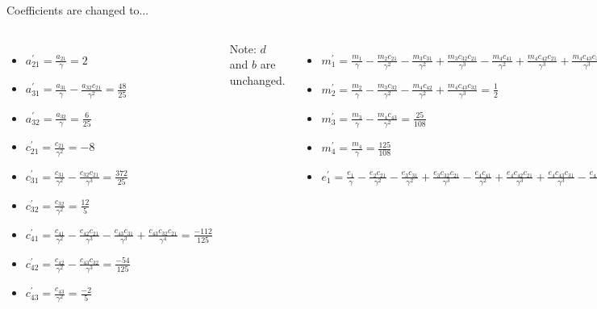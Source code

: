 \documentclass[serif]{beamer}
\begin{document}
\begin{frame}{Coefficients are changed to...}
  \begin{footnotesize}
  \begin{columns}[T]
  \begin{itemize}
    \item $a^\prime_{21} = \frac{a_{21}}{\gamma} = 2$ \vfill
    \item $a^\prime_{31} = \frac{a_{31}}{\gamma} - \frac{a_{32}c_{21}}{\gamma^2} = \frac{48}{25}$ \vfill
    \item $a^\prime_{32} = \frac{a_{32}}{\gamma} = \frac{6}{25}$ \vfill
    \item $c^\prime_{21} = \frac{c_{21}}{\gamma^2} = -8$ \vfill
    \item $c^\prime_{31} = \frac{c_{31}}{\gamma^2} - \frac{c_{32}c_{21}}{\gamma^3} = \frac{372}{25}$ \vfill
    \item $c^\prime_{32} = \frac{c_{32}}{\gamma^2} = \frac{12}{5}$ \vfill
    \item $c^\prime_{41} = \frac{c_{41}}{\gamma^2} - \frac{c_{42}c_{21}}{\gamma^3} - \frac{c_{43}c_{31}}{\gamma^3} + \frac{c_{43}c_{32}c_{21}}{\gamma^4} = \frac{-112}{125}$ \vfill
    \item $c^\prime_{42} = \frac{c_{42}}{\gamma^2} - \frac{c_{43}c_{32}}{\gamma^3} = \frac{-54}{125}$ \vfill
    \item $c^\prime_{43} = \frac{c_{43}}{\gamma^2} = \frac{-2}{5}$ \vfill
  \end{itemize}
  \alert{Note:} $d$ and $b$ are unchanged.
  \begin{itemize}
    \item $m^\prime_1 = \frac{m_1}{\gamma} - \frac{m_2c_{21}}{\gamma^2} - \frac{m_3c_{31}}{\gamma^2} + \frac{m_3c_{32}c_{21}}{\gamma^3} - \frac{m_4c_{41}}{\gamma^2} + \frac{m_4c_{42}c_{21}}{\gamma^3} + \frac{m_4c_{43}c_{31}}{\gamma^3} - \frac{m_4c_{43}c_{32}c_{21}}{\gamma^4} = \frac{19}{9}$
    \item $m^\prime_2 = \frac{m_2}{\gamma} - \frac{m_3c_{32}}{\gamma^2} - \frac{m_4c_{42}}{\gamma^2} + \frac{m_4c_{43}c_{32}}{\gamma^3} = \frac{1}{2}$
    \item $m^\prime_3 = \frac{m_3}{\gamma} - \frac{m_4c_{43}}{\gamma^2} = \frac{25}{108}$
    \item $m^\prime_4 = \frac{m_4}{\gamma} = \frac{125}{108}$
    \item $e^\prime_1 = \frac{e_1}{\gamma} - \frac{e_2c_{21}}{\gamma^2} - \frac{e_3c_{31}}{\gamma^2} + \frac{e_3c_{32}c_{21}}{\gamma^3} - \frac{e_4c_{41}}{\gamma^2} + \frac{e_4c_{42}c_{21}}{\gamma^3} + \frac{e_4c_{43}c_{31}}{\gamma^3} - \frac{e_4c_{43}c_{32}c_{21}}{\gamma^4} = \frac{17}{54}$

\end{itemize}
\end{columns}
\end{footnotesize}
\end{frame}
\end{document}
